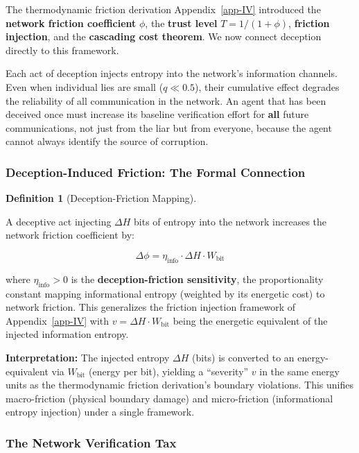 \documentclass[11pt]{article}
\theoremstyle{plain}
\theoremstyle{definition}
\newtheorem{definition}{Definition}
\theoremstyle{remark}
\let\origsubsubsection\subsubsection
\renewcommand{\subsubsection}{\needspace{4\baselineskip}\origsubsubsection}
\begin{document}
The thermodynamic friction derivation Appendix~\ref{app-IV} introduced
the \textbf{network friction coefficient} \(\phi\), the \textbf{trust
level} \(T = 1/(1 + \phi)\), \textbf{friction injection}, and the
\textbf{cascading cost theorem}. We now connect deception directly to
this framework.

Each act of deception injects entropy into the network's information
channels. Even when individual lies are small (\(q \ll 0.5\)), their
cumulative effect degrades the reliability of all communication in the
network. An agent that has been deceived once must increase its baseline
verification effort for \textbf{all} future communications, not just
from the liar but from everyone, because the agent cannot always
identify the source of corruption.

\subsubsection{Deception-Induced Friction: The Formal
Connection}\label{deception-induced-friction-the-formal-connection}

\begin{definition}[Deception-Friction Mapping]
\label{def-deception-friction-mapping}

A deceptive act injecting $\Delta H$ bits of entropy into the network increases the network friction coefficient by:

$$\Delta \phi = \eta_{\text{info}} \cdot \Delta H \cdot W_{\text{bit}}$$

where $\eta_{\text{info}} > 0$ is the \textbf{deception-friction sensitivity}, the proportionality constant mapping informational entropy (weighted by its energetic cost) to network friction. This generalizes the friction injection framework of Appendix~\ref{app-IV} with $v = \Delta H \cdot W_{\text{bit}}$ being the energetic equivalent of the injected information entropy.
\end{definition}

\textbf{Interpretation:} The injected entropy \(\Delta H\) (bits) is
converted to an energy-equivalent via \(W_{\text{bit}}\) (energy per
bit), yielding a ``severity'' \(v\) in the same energy units as the
thermodynamic friction derivation's boundary violations. This unifies
macro-friction (physical boundary damage) and micro-friction
(informational entropy injection) under a single framework.

\subsubsection{The Network Verification
Tax}\label{the-network-verification-tax}
\end{document}
